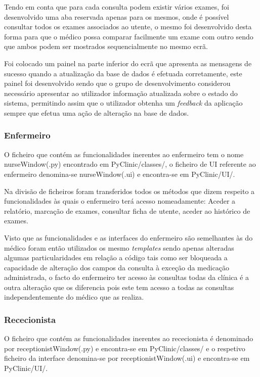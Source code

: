 \documentclass[11pt,a4paper,twoside]{report}
\begin{document}
	Tendo em conta que para cada consulta podem existir vários exames, foi desenvolvido uma aba reservada apenas para os mesmos, onde é possível consultar todos os exames associados ao utente, o mesmo foi desenvolvido desta forma para que o médico possa comparar facilmente um exame com outro sendo que ambos podem ser mostrados sequencialmente no mesmo ecrã.
	
	Foi colocado um painel na parte inferior do ecrã que apresenta as mensagens de sucesso quando a atualização da base de dados é efetuada corretamente, este painel foi desenvolvido sendo que o grupo de desenvolvimento considerou necessário apresentar ao utilizador informação atualizada sobre o estado do sistema, permitindo assim que o utilizador obtenha um \textit{feedback} da aplicação sempre que efetua uma ação de alteração na base de dados.
	
	\subsubsection{Enfermeiro}
	O ficheiro que contém as funcionalidades inerentes ao enfermeiro tem o nome nurseWindow(.py) encontrado em PyClinic/classes/, o ficheiro de UI referente ao enfermeiro denomina-se nurseWindow(.ui) e encontra-se em PyClinic/UI/.
	
	Na divisão de ficheiros foram transferidos todos os métodos que dizem respeito a funcionalidades às quais o enfermeiro terá acesso nomeadamente: Aceder a relatório, marcação de exames, consultar ficha de utente, aceder ao histórico de exames.
	
	Visto que as funcionalidades e as interfaces do enfermeiro são semelhantes às do médico foram então utilizados os mesmo \textit{templates} sendo apenas alteradas algumas particularidades em relação a código tais como ser bloqueada a capacidade de alteração dos campos da consulta à exceção da medicação administrada, o facto do enfermeiro ter acesso às consultas todas da clínica é a outra alteração que os diferencia pois este tem acesso a todas as consultas independentemente do médico que as realiza.
	\subsubsection{Rececionista}
	
	O ficheiro que contém as funcionalidades inerentes ao rececionista é denominado por receptionistWindow(.py) e encontra-se em PyClinic/classes/ e o respetivo ficheiro da interface denomina-se por receptionistWindow(.ui) e encontra-se em PyClinic/UI/. 
	
\end{document}
